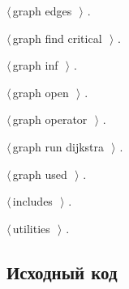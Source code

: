 \documentclass[12pt]{article}
\begin{document}
{\begin{list}{}{\setlength{\itemsep}{-\parsep}\setlength{\itemindent}{-\leftmargin}}
\item $\langle\,$graph edges\nobreak\ {\footnotesize {}}$\,\rangle$ {\footnotesize {\NWtxtRefIn} .}
\item $\langle\,$graph find critical\nobreak\ {\footnotesize {}}$\,\rangle$ {\footnotesize {\NWtxtRefIn} .}
\item $\langle\,$graph inf\nobreak\ {\footnotesize {}}$\,\rangle$ {\footnotesize {\NWtxtRefIn} .}
\item $\langle\,$graph open\nobreak\ {\footnotesize {}}$\,\rangle$ {\footnotesize {\NWtxtRefIn} .}
\item $\langle\,$graph operator\nobreak\ {\footnotesize {}}$\,\rangle$ {\footnotesize {\NWtxtRefIn} .}
\item $\langle\,$graph run dijkstra\nobreak\ {\footnotesize {}}$\,\rangle$ {\footnotesize {\NWtxtRefIn} .}
\item $\langle\,$graph used\nobreak\ {\footnotesize {}}$\,\rangle$ {\footnotesize {\NWtxtRefIn} .}
\item $\langle\,$includes\nobreak\ {\footnotesize {}}$\,\rangle$ {\footnotesize {\NWtxtRefIn} .}
\item $\langle\,$utilities\nobreak\ {\footnotesize {}}$\,\rangle$ {\footnotesize {\NWtxtRefIn} .}
\end{list}}

\subsection{Исходный код}
\end{document}
